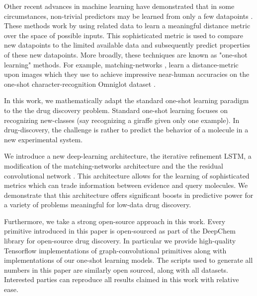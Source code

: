 Other recent advances in machine learning have demonstrated that in some circumstances, non-trivial predictors may be learned from only a few datapoints \cite{lake2015human, santoro2016one, vinyals2016matching}. These methods work by using related data to learn a meaningful distance metric over the space of possible inputs. This sophisticated metric is used to compare new datapoints to the limited available data and subsequently predict properties of these new datapoints. More broadly, these techniques are known as "one-shot learning" methods. For example, matching-networks \cite{vinyals2016matching}, learn a distance-metric upon images which they use to achieve impressive near-human accuracies on the one-shot character-recognition Omniglot dataset \cite{lake2015human}.

In this work, we mathematically adapt the standard one-shot learning paradigm to the the drug discovery problem. Standard one-shot learning focuses on recognizing new-classes (say recognizing a giraffe given only one example). In drug-discovery, the challenge is rather to predict the behavior of a molecule in a new experimental system.

We introduce a new deep-learning architecture, the iterative refinement LSTM, a modification of the matching-networks architecture and the the residual convolutional network \cite{he2016identity}. This architecture allows for the learning of sophisticated metrics which can trade information between evidence and query molecules. We demonstrate that this architecture offers significant boosts in predictive power for a variety of problems meaningful for low-data drug discovery.

Furthermore, we take a strong open-source approach in this work. Every primitive introduced in this paper is open-sourced as part of the DeepChem \cite{ram2016} library for open-source drug discovery. In particular we provide high-quality Tensorflow \cite{abadi2016tensorflow} implementations of graph-convolutional primitives along with implementations of our one-shot learning models. The scripts used to generate all numbers in this paper are similarly open sourced, along with all datasets. Interested parties can reproduce all results claimed in this work with relative ease.


